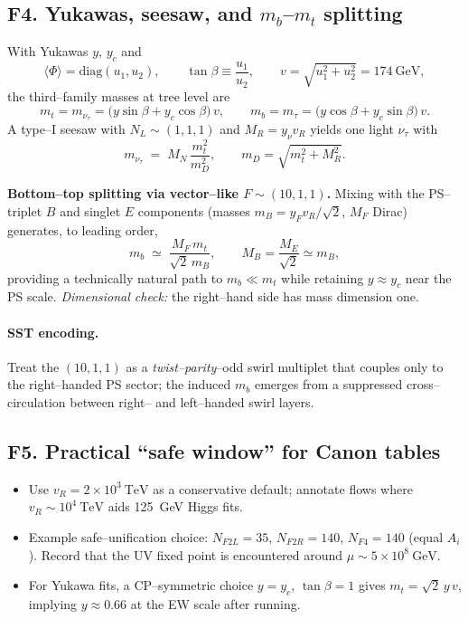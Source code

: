 \documentclass[11pt]{article}
\begin{document}
  \subsection*{F4. Yukawas, seesaw, and $m_b$–$m_t$ splitting}

      With Yukawas $y$, $y_c$ and
      \[
          \langle\Phi\rangle=\mathrm{diag}(u_1,u_2),\qquad
          \tan\beta\equiv \frac{u_1}{u_2},\qquad
          v=\sqrt{u_1^2+u_2^2}=174~\mathrm{GeV},
      \]
      the third–family masses at tree level are
      \begin{equation}
      m_t=m_{\nu_\tau}=\bigl(y\sin\beta+y_c\cos\beta\bigr)\,v,\qquad
      m_b=m_{\tau}=\bigl(y\cos\beta+y_c\sin\beta\bigr)\,v.
      \end{equation}
      A type–I seesaw with $N_L\sim(1,1,1)$ and $M_R=y_\nu v_R$ yields one light $\nu_\tau$ with
      \begin{equation}
      m_{\nu_\tau}\;=\;M_N\,\frac{m_t^2}{m_D^2},\qquad
      m_D=\sqrt{m_t^2+M_R^2}.
      \end{equation}

      \textbf{Bottom–top splitting via vector–like $F\sim(10,1,1)$.}
      Mixing with the PS–triplet $B$ and singlet $E$ components (masses $m_B=y_F v_R/\sqrt{2}$, $M_F$ Dirac) generates, to leading order,
      \begin{equation}
      m_b\;\simeq\;\frac{M_F\,m_t}{\sqrt{2}\,m_B},\qquad
      M_B=\frac{M_E}{\sqrt{2}}\simeq m_B,
      \end{equation}
      providing a technically natural path to $m_b\ll m_t$ while retaining $y\approx y_c$ near the PS scale.
      \textit{Dimensional check:} the right–hand side has mass dimension one.

      \paragraph{SST encoding.}
          Treat the $(10,1,1)$ as a \emph{twist–parity}–odd swirl multiplet that couples only to the right–handed PS sector; the induced $m_b$ emerges from a suppressed cross–circulation between right– and left–handed swirl layers.

  \subsection*{F5. Practical “safe window” for Canon tables}

  \begin{itemize}
  \item Use $v_R=2\times10^{3}\ \text{TeV}$ as a conservative default; annotate flows where $v_R\sim10^{4}\ \text{TeV}$ aids 125~GeV Higgs fits.
  \item Example safe–unification choice: $N_{F2L}=35$, $N_{F2R}=140$, $N_{F4}=140$ (equal $A_i$). Record that the UV fixed point is encountered around $\mu\sim5\times10^{8}\ \text{GeV}$.
  \item For Yukawa fits, a CP–symmetric choice $y=y_c$, $\tan\beta=1$ gives $m_t=\sqrt{2}\,y\,v$, implying $y\approx 0.66$ at the EW scale after running.
  \end{itemize}
\end{document}

